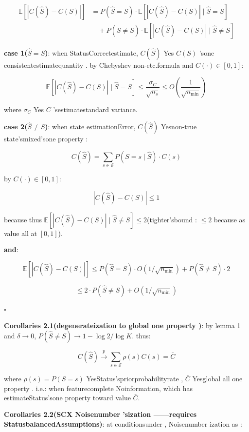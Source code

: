 \documentclass[
  12pt,
]{article}
\begin{document}
\[\begin{aligned}
\mathbb{E}\left[|C(\hat{S}) - C(S)|\right]
&= P(\hat{S} = S) \cdot \mathbb{E}[|C(\hat{S}) - C(S)| \mid \hat{S} = S] \\
&\quad + P(\hat{S} \neq S) \cdot \mathbb{E}[|C(\hat{S}) - C(S)| \mid \hat{S} \neq S]
\end{aligned}\]

\textbf{case 1(\(\hat{S} = S\))}: when StatusCorrectestimate, \(C(\hat{S})\) Yes
\(C(S)\) 'sone consistentestimatequantity . by  Chebyshev non-etc.formula and  \(C(\cdot) \in [0, 1]\): 

\[\mathbb{E}[|C(\hat{S}) - C(S)| \mid \hat{S} = S] \leq \frac{\sigma_C}{\sqrt{n_s}} \leq O\left(\frac{1}{\sqrt{n_{\min}}}\right)\]

where \(\sigma_C\) Yes \(C\) 'sestimatestandard variance. 

\textbf{case 2(\(\hat{S} \neq S\))}: when state estimationError, \(C(\hat{S})\)
Yesnon-true state'smixed'sone property : 

\[C(\hat{S}) = \sum_{s \in \mathcal{S}} P(S = s \mid \hat{S}) \cdot C(s)\]

by  \(C(\cdot) \in [0, 1]\): 

\[|C(\hat{S}) - C(S)| \leq 1\]

because thus
\(\mathbb{E}[|C(\hat{S}) - C(S)| \mid \hat{S} \neq S] \leq 2\)(tighter'sbound : \(\leq 2\)
because as value all at  \([0,1]\)). 

\textbf{and}: 

\[\mathbb{E}[|C(\hat{S}) - C(S)|] \leq P(\hat{S}=S) \cdot O(1/\sqrt{n_{\min}}) + P(\hat{S}\neq S) \cdot 2\]

\[\leq 2 \cdot P(\hat{S} \neq S) + O(1/\sqrt{n_{\min}})\]

\(\square\)

\textbf{Corollaries 2.1(degenerateization to global one property )}: by lemma  1 and 
\(\delta \to 0\), \(P(\hat{S} \neq S) \to 1 - \log 2 / \log K\). thus: 

\[C(\hat{S}) \xrightarrow{p} \sum_{s \in \mathcal{S}} \rho(s) C(s) = \bar{C}\]

where \(\rho(s) = P(S = s)\) YesStatus'spriorprobabilityrate , \(\bar{C}\)
Yesglobal all one property . i.e.: when featurecomplete Noinformation, which has estimateStatus'sone property toward value 
\(\bar{C}\). 

\textbf{Corollaries 2.2(SCX
Noisenumber 'sization ------requires StatusbalancedAssumptions)}: at conditionsunder , Noisenumber ization as : 
\end{document}
